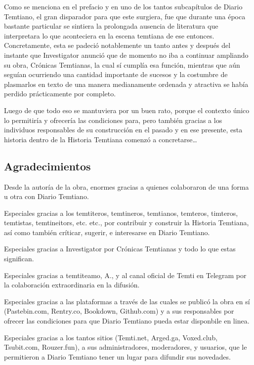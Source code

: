\documentclass[
  spanish,
]{book}
\begin{document}
Como se menciona en el prefacio y en uno de los tantos subcapítulos de Diario Temtiano, el gran disparador para que este surgiera, fue que durante una época bastante particular se sintiera la prolongada ausencia de literatura que interpretara lo que aconteciera en la escena temtiana de ese entonces. Concretamente, esta se padeció notablemente un tanto antes y después del instante que Investigator anunció que de momento no iba a continuar ampliando su obra, Crónicas Temtianas, la cual sí cumplía esa función, mientras que aún seguían ocurriendo una cantidad importante de sucesos y la costumbre de plasmarlos en texto de una manera medianamente ordenada y atractiva se había perdido prácticamente por completo.

Luego de que todo eso se mantuviera por un buen rato, porque el contexto único lo permitiría y ofrecería las condiciones para, pero también gracias a los individuos responsables de su construcción en el pasado y en ese presente, esta historia dentro de la Historia Temtiana comenzó a concretarse\ldots{}

\hypertarget{agradecimientos}{%
\subsection*{Agradecimientos}\label{agradecimientos}}

Desde la autoría de la obra, enormes gracias a quienes colaboraron de una forma u otra con Diario Temtiano.

Especiales gracias a los temtiteros, temtineros, temtianos, temteros, timteros, temtistas, temtineitors, etc. etc., por contribuir y construir la Historia Temtiana, así como también críticar, sugerir, e interesarse en Diario Temtiano.

Especiales gracias a Investigator por Crónicas Temtianas y todo lo que estas significan.

Especiales gracias a temtiteamo, A., y al canal oficial de Temti en Telegram por la colaboración extraordinaria en la difusión.

Especiales gracias a las plataformas a través de las cuales se publicó la obra en sí (Pastebin.com, Rentry.co, Bookdown, Github.com) y a sus responsables por ofrecer las condiciones para que Diario Temtiano pueda estar disponbile en linea.

Especiales gracias a los tantos sitios (Temti.net, Arged.ga, Voxed.club, Tsubit.com, Rouzer.fun), a sus administradores, moderadores, y usuarios, que le permitieron a Diario Temtiano tener un lugar para difundir sus novedades.
\end{document}
